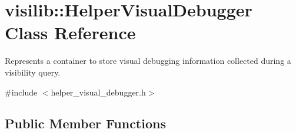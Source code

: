 \hypertarget{classvisilib_1_1_helper_visual_debugger}{}\section{visilib\+::Helper\+Visual\+Debugger Class Reference}
\label{classvisilib_1_1_helper_visual_debugger}


Represents a container to store visual debugging information collected during a visibility query.  




{\ttfamily \#include $<$helper\+\_\+visual\+\_\+debugger.\+h$>$}

\subsection*{Public Member Functions}
